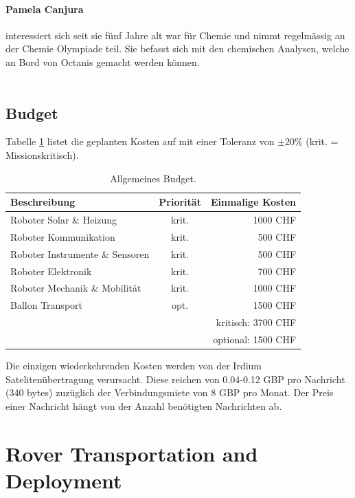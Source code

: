 \documentclass[a4paper,12pt]{article}
\begin{document}
\paragraph{Pamela Canjura} interessiert sich seit sie fünf Jahre alt war für Chemie und nimmt regelmässig an der Chemie Olympiade teil. Sie befasst sich mit den chemischen Analysen, welche an Bord von Octanis gemacht werden können.
\\ \\


\subsection{Budget}

Tabelle \ref{tabbudget} listet die geplanten Kosten auf mit einer Toleranz von $\pm 20\%$ (krit. = Missionskritisch). \\ 

\begin{table}[h!]
\centering
\begin{tabular}{ l | c || r }
  Beschreibung & Priorität & Einmalige Kosten \\
  \hline
  Roboter Solar \& Heizung & krit. & 1000 CHF \\
  Roboter Kommunikation & krit. & 500 CHF \\
  Roboter Instrumente \& Sensoren & krit. & 500 CHF \\
  Roboter Elektronik & krit. & 700 CHF \\
  Roboter Mechanik \& Mobilität & krit. & 1000 CHF \\
  Ballon Transport & opt. & 1500 CHF \\
  \hline \hline
  & & kritisch: 3700 CHF  \\
  & & optional: 1500 CHF \\
\end{tabular}
\label{tabbudget}
\caption{Allgemeines Budget.}
\end{table}

Die einzigen wiederkehrenden Kosten werden von der Irdium Satelitenübertragung \cite{iridium} verursacht. Diese reichen von 0.04-0.12 GBP pro Nachricht (340 bytes) zuzüglich der Verbindungsmiete von 8 GBP pro Monat. Der Preis einer Nachricht hängt von der Anzahl benötigten Nachrichten ab.



\section{Rover Transportation and Deployment}
\end{document}
